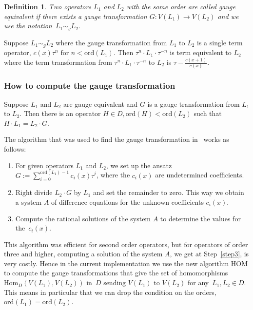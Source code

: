 \documentclass{article}
\newtheorem{definition}[theorem]{Definition}
\newcommand{\ord}{\mathrm{ord}}
\newcommand{\Hom}{\mathrm{Hom}}
\begin{document}
\begin{definition}\label{def:ge}
  Two operators $L_1$ and $L_2$ with the same order are called gauge equivalent if there
  exists a gauge transformation $G:V(L_1)\rightarrow V(L_2)$ and we use the notation~$L_1
  \sim_g L_2$.
\end{definition}


Suppose $L_1 \sim_g L_2$ where the gauge transformation from $L_1$ to $L_2$ is a single term operator, $c(x)\tau^n$ for $n < \ord(L_1)$. 
Then $\tau^n\cdot L_1 \cdot\tau^{-n}$ is term equivalent to $L_2$ where the term transformation from $\tau^n\cdot L_1 \cdot \tau^{-n}$ to $L_2$ is $\tau-\frac{c(x+1)}{c(x)}$.



\subsubsection{How to compute the gauge transformation}\label{hom}
Suppose $L_1$ and $L_2$ are gauge equivalent and $G$ is a gauge transformation from $L_1$
to $L_2$.  Then there is an operator $H \in D, \ord(H) < \ord(L_2)$ such that $H \cdot
L_1=L_2 \cdot G$.

The algorithm that was used to find the gauge transformation in~\cite{CH09, CHG10, GH10}
works as follows:
\begin{enumerate}
\item For given operators $L_1$ and $L_2$, we set up the ansatz
  $G:=\sum_{i=0}^{\ord(L_1)-1} c_i(x)\tau^i$, where the $c_i(x)$ are undetermined
  coefficients.
\item\label{step3} Right divide $L_2 \cdot G$ by $L_1$ and set the remainder to zero. This way we obtain a
  system $A$ of difference equations for the unknown coefficients $c_i(x)$.
\item  Compute the  rational  solutions of the  system   $A$ to determine  the  values for
  the~$c_i(x)$.
\end{enumerate}

This algorithm was efficient for second order operators, but for operators
  of order three and higher, computing a solution of the system $A$, we get at
  Step~\ref{step3}, is very costly. Hence in the current implementation we use the new
algorithm HOM to compute the gauge transformations that give the set of homomorphisms
$\Hom_D(V(L_1),V(L_2))$ in~$D$ sending $V(L_1)$ to $V(L_2)$ for any~$L_1,L_2\in D$. This
means in particular that we can drop the condition on the orders,~$\ord(L_1) = \ord(L_2)$.
\end{document}
